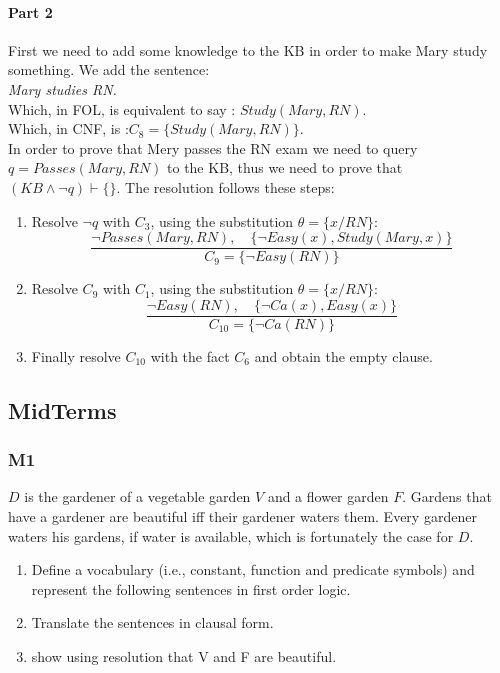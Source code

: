 \documentclass[10pt,a4paper]{article}
\begin{document}
\paragraph{Part 2}
First we need to add some knowledge to the KB in order to make Mary study something. We add the sentence:\\
\textit{Mary studies RN.}\\
Which, in FOL, is equivalent to say : $Study(Mary,RN)$.\\
Which, in CNF, is :$C_8=\lbrace Study(Mary,RN) \rbrace$.\\
In order to prove that Mery passes the RN exam we need to query $q=Passes(Mary,RN)$ to the KB, thus we need to prove that $(KB \wedge \neg q) \vdash \{\}$. The resolution follows these steps:
\begin{enumerate}
    \item Resolve $\neg q$ with $C_3$, using the substitution $\theta=\lbrace x/RN \rbrace$:
    \[\frac{\neg Passes(Mary,RN),\quad \lbrace \neg Easy(x), Study(Mary,x) \rbrace}{C_9=\lbrace \neg Easy(RN) \rbrace}\]
    \item Resolve $C_9$ with $C_1$,  using the substitution $\theta=\lbrace x/RN \rbrace$:
    \[\frac{\neg Easy(RN),\quad \lbrace \neg Ca(x), Easy(x) \rbrace}{C_{10}=\lbrace \neg Ca(RN) \rbrace}\]
    
    \item Finally resolve $C_{10}$ with the fact $C_6$ and obtain the empty clause.
\end{enumerate}

\vfill

\subsection{MidTerms}
\subsubsection{M1}


$D$ is the gardener of a vegetable garden $V$ and a flower garden $F$. Gardens that have a gardener are beautiful iff their gardener waters them. Every gardener waters his gardens, if water is available, which is fortunately the case for $D$.
\begin{enumerate}
\item  Define a vocabulary (i.e., constant, function and predicate symbols) and represent the following sentences in first order logic.
\item Translate the sentences in clausal form.
\item show using resolution that V and F are beautiful.
\end{enumerate}
\end{document}
